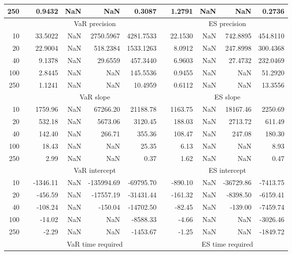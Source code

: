 {\begin{table}[h]
\begin{tabular}{rr rrrr r rrrr}
250 && 0.9432  &    NaN  &    NaN & 0.3087 && 1.2791  &    NaN  &    NaN & 0.2736 \\ 
\hline 
 & & \multicolumn{4}{c}{VaR precision} &&  \multicolumn{4}{c}{ES precision} \\ \cline{3-6}  \cline{8-11}
10 && 33.5022  &    NaN  & 2750.5967 & 4281.7533 & & 22.1530  &    NaN  & 742.8895 & 454.8110 \\ 
20 && 22.9004  &    NaN  & 518.2384 & 1533.1263 & & 8.0912  &    NaN  & 247.8998 & 300.4368 \\ 
40 && 9.1378  &    NaN  & 29.6559 & 457.3440 & & 6.9603  &    NaN  & 27.4732 & 232.0469 \\ 
100 && 2.8445  &    NaN  &    NaN & 145.5536 & & 0.9455  &    NaN  &    NaN & 51.2920 \\ 
250 && 1.1241  &    NaN  &    NaN & 10.4959 & & 0.6112  &    NaN  &    NaN & 13.3556 \\ 
\hline 
 & & \multicolumn{4}{c}{ VaR slope} &&  \multicolumn{4}{c}{ES slope} \\ \cline{3-6}  \cline{8-11}
10 && 1759.96  &  NaN  & 67266.20 & 21188.78 && 1163.75  &  NaN  & 18167.46 & 2250.69 \\ 
20 && 532.18  &  NaN  & 5673.06 & 3120.45 && 188.03  &  NaN  & 2713.72 & 611.49 \\ 
40 && 142.40  &  NaN  & 266.71 & 355.36 && 108.47  &  NaN  & 247.08 & 180.30 \\ 
100 && 18.43  &  NaN  &  NaN & 25.35 && 6.13  &  NaN  &  NaN & 8.93 \\ 
250 && 2.99  &  NaN  &  NaN & 0.37 && 1.62  &  NaN  &  NaN & 0.47 \\ 
\hline 
 & & \multicolumn{4}{c}{ VaR intercept} &&  \multicolumn{4}{c}{ES intercept} \\ \cline{3-6}  \cline{8-11}
10 && -1346.11  &  NaN  & -135994.69 & -69795.70 && -890.10  &  NaN  & -36729.86 & -7413.75 \\ 
20 && -456.59  &  NaN  & -17557.19 & -31431.44 && -161.32  &  NaN  & -8398.50 & -6159.41 \\ 
40 && -108.24  &  NaN  & -150.04 & -14702.50 && -82.45  &  NaN  & -139.00 & -7459.74 \\ 
100 && -14.02  &  NaN  &  NaN & -8588.33 && -4.66  &  NaN  &  NaN & -3026.46 \\ 
250 && -2.29  &  NaN  &  NaN & -1453.67 && -1.25  &  NaN  &  NaN & -1849.72 \\ 
\hline 
 & & \multicolumn{4}{c}{VaR time required} && \multicolumn{4}{c}{ES time required} \\ \cline{3-6}  \cline{8-11}

\end{tabular}
\end{table}}
